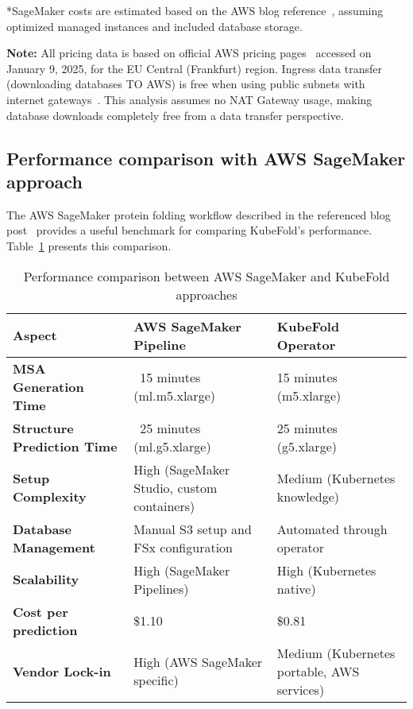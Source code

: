 *SageMaker costs are estimated based on the AWS blog reference~\cite{aws-sagemaker-protein-folding}, assuming optimized managed instances and included database storage.

\textbf{Note:} All pricing data is based on official AWS pricing pages~\cite{aws-ec2-pricing,aws-fsx-pricing} accessed on January 9, 2025, for the EU Central (Frankfurt) region. Ingress data transfer (downloading databases TO AWS) is free when using public subnets with internet gateways~\cite{aws-ec2-pricing}. This analysis assumes no NAT Gateway usage, making database downloads completely free from a data transfer perspective.

\subsection{Performance comparison with AWS SageMaker approach}

The AWS SageMaker protein folding workflow described in the referenced blog post~\cite{aws-sagemaker-protein-folding} provides a useful benchmark for comparing KubeFold's performance. Table~\ref{tab:sagemaker_comparison} presents this comparison.

\begin{table}[H]
    \centering
    \small
    \begin{tabularx}{\textwidth}{|X|X|X|}
        \hline
        \textbf{Aspect} & \textbf{AWS SageMaker Pipeline} & \textbf{KubeFold Operator} \\
        \hline
        \textbf{MSA Generation Time} & ~15 minutes (ml.m5.xlarge) & 15 minutes (m5.xlarge) \\
        \hline
        \textbf{Structure Prediction Time} & ~25 minutes (ml.g5.xlarge) & 25 minutes (g5.xlarge) \\
        \hline
        \textbf{Setup Complexity} & High (SageMaker Studio, custom containers) & Medium (Kubernetes knowledge) \\
        \hline
        \textbf{Database Management} & Manual S3 setup and FSx configuration & Automated through operator \\
        \hline
        \textbf{Scalability} & High (SageMaker Pipelines) & High (Kubernetes native) \\
        \hline
        \textbf{Cost per prediction} & \$1.10 & \$0.81 \\
        \hline
        \textbf{Vendor Lock-in} & High (AWS SageMaker specific) & Medium (Kubernetes portable, AWS services) \\
        \hline
    \end{tabularx}
    \caption{Performance comparison between AWS SageMaker and KubeFold approaches}
    \label{tab:sagemaker_comparison}
\end{table}

